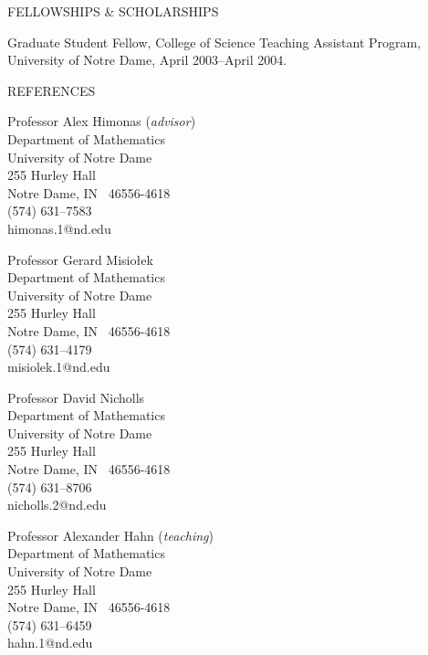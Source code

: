 \documentclass[11pt]{article}
\begin{document}
\vspace{0.3in}
{\bld FELLOWSHIPS \& SCHOLARSHIPS}

\vspace{0.1in}
\parbox[t]{0.5in}{\hspace{1in}}
\parbox[t]{6.5in}
     { Graduate Student Fellow, College of Science Teaching Assistant
Program, University of Notre Dame, April 2003--April 2004.

       


     }








\vspace{0.3in}

{\bld REFERENCES}

\vspace{0.1in}
\parbox[t]{0.5in}{\hspace{1in}}
\parbox[t]{3.25in}
     { Professor Alex Himonas ({\em{advisor}})\\
       Department of Mathematics \\
       University of Notre Dame \\
							255 Hurley Hall\\
       Notre Dame, IN \ 46556-4618 \\
       (574) 631--7583 \\
       himonas.1@nd.edu
     }
\parbox[t]{3.25in}
     { Professor Gerard Misio\l ek \\
       Department of Mathematics \\
       University of Notre Dame \\
							255 Hurley Hall\\
       Notre Dame, IN \ 46556-4618 \\
       (574) 631--4179 \\
       misiolek.1@nd.edu
     }

\vspace{0.25in}
\parbox[t]{0.5in}{\hspace{1in}}
\parbox[t]{3.25in}
     {Professor David Nicholls \\
       Department of Mathematics \\
       University of Notre Dame \\
							255 Hurley Hall\\
       Notre Dame, IN \ 46556-4618 \\
       (574) 631--8706 \\
       nicholls.2@nd.edu
     }
\parbox[t]{3.25in}
     { Professor Alexander Hahn ({\em{teaching}})\\
       Department of Mathematics \\
       University of Notre Dame \\
								255 Hurley Hall\\
       Notre Dame, IN \ 46556-4618 \\
       (574) 631--6459 \\
       hahn.1@nd.edu
     }
\end{document}
